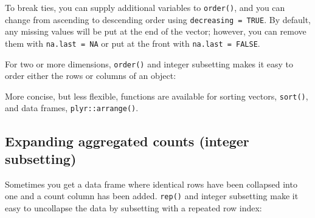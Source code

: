 To break ties, you can supply additional variables to \texttt{order()},
and you can change from ascending to descending order using
\texttt{decreasing = TRUE}. By default, any missing values will be put
at the end of the vector; however, you can remove them with
\texttt{na.last = NA} or put at the front with \texttt{na.last = FALSE}.

For two or more dimensions, \texttt{order()} and integer subsetting
makes it easy to order either the rows or columns of an object:

\begin{Shaded}
\begin{Highlighting}[]
\StringTok{ }\NormalTok{df[}\NormalTok{(}\NormalTok{:}\NormalTok{]}

\NormalTok{df2[}\NormalTok{(df2$x), ]}
\NormalTok{df2[, }\NormalTok{(}\NormalTok{(df2))]}
\end{Highlighting}
\end{Shaded}

More concise, but less flexible, functions are available for sorting
vectors, \texttt{sort()}, and data frames, \texttt{plyr::arrange()}.

\subsection{Expanding aggregated counts (integer subsetting)}

Sometimes you get a data frame where identical rows have been collapsed
into one and a count column has been added. \texttt{rep()} and integer
subsetting make it easy to uncollapse the data by subsetting with a
repeated row index:

